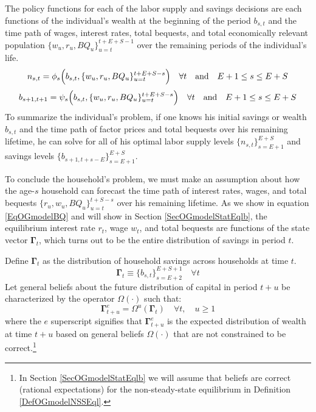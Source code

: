 \documentclass[letterpaper,12pt]{article}
\theoremstyle{definition}
\begin{document}
    The policy functions for each of the labor supply and savings decisions are each functions of the individual's wealth at the beginning of the period $b_{s,t}$ and the time path of wages, interest rates, total bequests, and total economically relevant population $\{w_u,r_u,BQ_u\}_{u=t}^{t+E+S-1}$ over the remaining periods of the individual's life.
    \begin{equation}\label{EqOGmodelPhiGen}
      n_{s,t} = \phi_{s}\Bigl(b_{s,t}, \{w_u,r_u,BQ_u\}_{u=t}^{t+E+S-s}\Bigr) \quad\forall t \quad\text{and}\quad E+1\leq s\leq E+S
    \end{equation}
    \begin{equation}\label{EqOGmodelPsiGen}
      b_{s+1,t+1} = \psi_{s}\Bigl(b_{s,t}, \{w_u,r_u,BQ_u\}_{u=t}^{t+E+S-s}\Bigr) \quad\forall t \quad\text{and}\quad E+1\leq s\leq E+S
    \end{equation}
    To summarize the individual's problem, if one knows his initial savings or wealth $b_{s,t}$ and the time path of factor prices and total bequests over his remaining lifetime, he can solve for all of his optimal labor supply levels $\{n_{s,t}\}_{s=E+1}^{E+S}$ and savings levels $\{b_{s+1,t+s-E}\}_{s=E+1}^{E+S}$.

    To conclude the household's problem, we must make an assumption about how the age-$s$ household can forecast the time path of interest rates, wages, and total bequests $\{r_u, w_u, BQ_u\}_{u=t}^{t+S-s}$ over his remaining lifetime. As we show in equation \eqref{EqOGmodelBQ} and will show in Section \ref{SecOGmodelStatEqlb}, the equilibrium interest rate $r_t$, wage $w_t$, and total bequests are functions of the state vector $\bm{\Gamma}_t$, which turns out to be the entire distribution of savings in period $t$.

    Define $\bm{\Gamma}_t$ as the distribution of household savings across households at time $t$.
    \begin{equation}\label{EqOGmodelSavDist}
      \bm{\Gamma}_t \equiv \bigl\{b_{s,t}\bigr\}_{s=E+2}^{E+S+1} \quad\forall t
    \end{equation}
    Let general beliefs about the future distribution of capital in period $t+u$ be characterized by the operator $\Omega(\cdot)$ such that:
    \begin{equation}\label{EqOGmodelBeliefs}
      \bm{\Gamma}^e_{t+u} = \Omega^u\left(\bm{\Gamma}_t\right) \quad \forall t, \quad u\geq 1
    \end{equation}
    where the $e$ superscript signifies that $\bm{\Gamma}^e_{t+u}$ is the expected distribution of wealth at time $t+u$ based on general beliefs $\Omega(\cdot)$ that are not constrained to be correct.\footnote{In Section \ref{SecOGmodelStatEqlb} we will assume that beliefs are correct (rational expectations) for the non-steady-state equilibrium in Definition \ref{DefOGmodelNSSEql}.}
\end{document}

